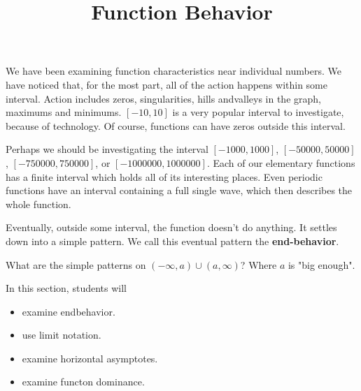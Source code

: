 \documentclass{ximera}
\title{Function Behavior}
\begin{document}
\begin{abstract}
\end{abstract}
\maketitle




We have been examining function characteristics near individual numbers. We have noticed that, for the most part, all of the action happens within some interval.  Action includes zeros, singularities, hills andvalleys in the graph, maximums and minimums.  $[-10, 10]$  is a very popular interval to investigate, because of technology.  Of course, functions can have zeros outside this interval.  

Perhaps we should be investigating the interval $[-1000, 1000]$, $[-50000, 50000]$, $[-750000, 750000]$, or $[-1000000, 1000000]$. Each of our elementary functions has a finite interval which holds all of its interesting places.  Even periodic functions have an interval containing a full single wave, which then describes the whole function.

Eventually, outside some interval, the function doesn't do anything.  It settles down into a simple pattern.  We call this eventual pattern the \textbf{end-behavior}.



What are the simple patterns on $(-\infty, a) \cup (a, \infty)$?  Where $a$ is "big enough".











\begin{sectionOutcomes}
In this section, students will 

\begin{itemize}
\item examine endbehavior.
\item use limit notation.
\item examine horizontal asymptotes.
\item examine functon dominance.
\end{itemize}
\end{sectionOutcomes}
\end{document}
